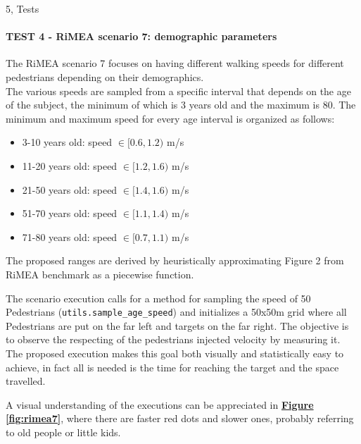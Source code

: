 \documentclass[10pt,a4paper]{article}
\begin{document}
\begin{task}{5, Tests}
\paragraph{TEST 4 - RiMEA scenario 7: demographic parameters}
The RiMEA scenario 7 focuses on having different walking speeds for different pedestrians depending on their demographics.\\
The various speeds are sampled from a specific interval that depends on the age of the subject, the minimum of which is 3 years old and the maximum is 80.
The minimum and maximum speed for every age interval is organized as follows:
\begin{itemize}
    \item 3-10 years old: speed $\in[0.6, 1.2)$ m/s
    \item 11-20 years old: speed $\in[1.2, 1.6)$ m/s
    \item 21-50 years old: speed $\in[1.4, 1.6)$ m/s
    \item 51-70 years old: speed $\in[1.1, 1.4)$ m/s
    \item 71-80 years old: speed $\in[0.7, 1.1)$ m/s
\end{itemize}
The proposed ranges are derived by heuristically approximating Figure 2 from RiMEA \cite{RiMEA} benchmark as a piecewise function.

The scenario execution calls for a method for sampling the speed of 50 Pedestrians (\texttt{utils.sample\_age\_speed}) and initializes a 50x50m grid where all Pedestrians are put on the far left and targets on the far right. The objective is to observe the respecting of the pedestrians injected velocity by measuring it. The proposed execution makes this goal both visually and statistically easy to achieve, in fact all is needed is the time for reaching the target and the space travelled.

A visual understanding of the executions can be appreciated in \textbf{\hyperref[fig:rimea7]{ Figure \ref{fig:rimea7}}}, where there are faster red dots and slower ones, probably referring to old people or little kids.


\end{task}
\end{document}
